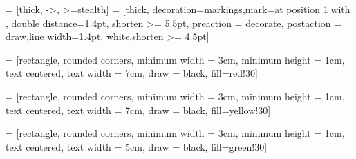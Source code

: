  = [thick, ->, >=stealth]
 = [thick, decoration={markings,mark=at position
   1 with {}},
   double distance=1.4pt, shorten >= 5.5pt,
   preaction = {decorate},
   postaction = {draw,line width=1.4pt, white,shorten >= 4.5pt}]

 = [rectangle, rounded corners, minimum width = 3cm, minimum height = 1cm, text centered, text width = 7cm, draw = black, fill=red!30]

 = [rectangle, rounded corners, minimum width = 3cm, minimum height = 1cm, text centered, text width = 7cm, draw = black, fill=yellow!30]

 = [rectangle, rounded corners, minimum width = 3cm, minimum height = 1cm, text centered, text width = 5cm, draw = black, fill=green!30]
    

